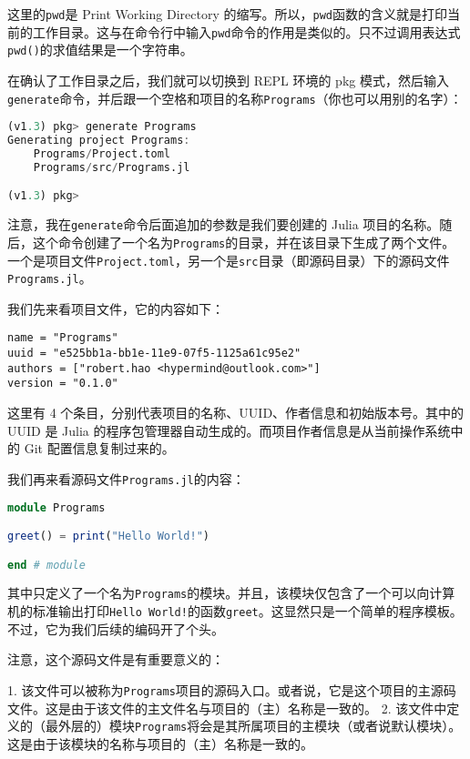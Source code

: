 这里的\verb`pwd`是 Print Working Directory 的缩写。所以，\verb`pwd`函数的含义就是打印当前的工作目录。这与在命令行中输入\verb`pwd`命令的作用是类似的。只不过调用表达式\verb`pwd()`的求值结果是一个字符串。

在确认了工作目录之后，我们就可以切换到 REPL 环境的 pkg 模式，然后输入\verb`generate`命令，并后跟一个空格和项目的名称\verb`Programs`（你也可以用别的名字）：

\begin{lstlisting}[language=julia]
(v1.3) pkg> generate Programs
Generating project Programs:
    Programs/Project.toml
    Programs/src/Programs.jl

(v1.3) pkg> 
\end{lstlisting}

注意，我在\verb`generate`命令后面追加的参数是我们要创建的 Julia 项目的名称。随后，这个命令创建了一个名为\verb`Programs`的目录，并在该目录下生成了两个文件。一个是项目文件\verb`Project.toml`，另一个是\verb`src`目录（即源码目录）下的源码文件\verb`Programs.jl`。

我们先来看项目文件，它的内容如下：

\begin{lstlisting}[language=none]
name = "Programs"
uuid = "e525bb1a-bb1e-11e9-07f5-1125a61c95e2"
authors = ["robert.hao <hypermind@outlook.com>"]
version = "0.1.0"
\end{lstlisting}

这里有 4 个条目，分别代表项目的名称、UUID、作者信息和初始版本号。其中的 UUID 是 Julia 的程序包管理器自动生成的。而项目作者信息是从当前操作系统中的 Git 配置信息复制过来的。

我们再来看源码文件\verb`Programs.jl`的内容：

\begin{lstlisting}[language=julia]
module Programs

greet() = print("Hello World!")

end # module
\end{lstlisting}

其中只定义了一个名为\verb`Programs`的模块。并且，该模块仅包含了一个可以向计算机的标准输出打印\verb`Hello World!`的函数\verb`greet`。这显然只是一个简单的程序模板。不过，它为我们后续的编码开了个头。

注意，这个源码文件是有重要意义的：

1. 该文件可以被称为\verb`Programs`项目的源码入口。或者说，它是这个项目的主源码文件。这是由于该文件的主文件名与项目的（主）名称是一致的。
2. 该文件中定义的（最外层的）模块\verb`Programs`将会是其所属项目的主模块（或者说默认模块）。这是由于该模块的名称与项目的（主）名称是一致的。

